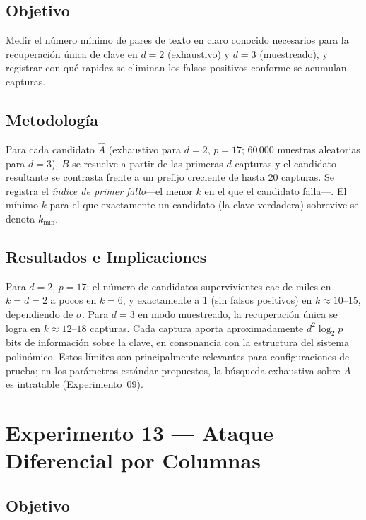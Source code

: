 \documentclass[12pt,a4paper]{article}
\theoremstyle{definition}
\begin{document}
\subsection{Objetivo}

Medir el número mínimo de pares de texto en claro conocido necesarios
para la recuperación única de clave en $d = 2$ (exhaustivo) y
$d = 3$ (muestreado), y registrar con qué rapidez se eliminan los
falsos positivos conforme se acumulan capturas.

\subsection{Metodología}

Para cada candidato $\hat{A}$ (exhaustivo para $d = 2$, $p = 17$;
60\,000 muestras aleatorias para $d = 3$), $B$ se resuelve a partir
de las primeras $d$ capturas y el candidato resultante se contrasta
frente a un prefijo creciente de hasta 20 capturas. Se registra el
\emph{índice de primer fallo}---el menor $k$ en el que el candidato
falla---. El mínimo $k$ para el que exactamente un candidato (la
clave verdadera) sobrevive se denota $k_{\min}$.

\subsection{Resultados e Implicaciones}

Para $d = 2$, $p = 17$: el número de candidatos supervivientes cae de
miles en $k = d = 2$ a pocos en $k = 6$, y exactamente a 1 (sin
falsos positivos) en $k \approx 10$--$15$, dependiendo de $\sigma$.
Para $d = 3$ en modo muestreado, la recuperación única se logra en
$k \approx 12$--$18$ capturas. Cada captura aporta aproximadamente
$d^2 \log_2 p$ bits de información sobre la clave, en consonancia
con la estructura del sistema polinómico. Estos límites son
principalmente relevantes para configuraciones de prueba; en los
parámetros estándar propuestos, la búsqueda exhaustiva sobre $A$ es
intratable (Experimento~09).

\section{Experimento 13 --- Ataque Diferencial por Columnas}

\subsection{Objetivo}
\end{document}
